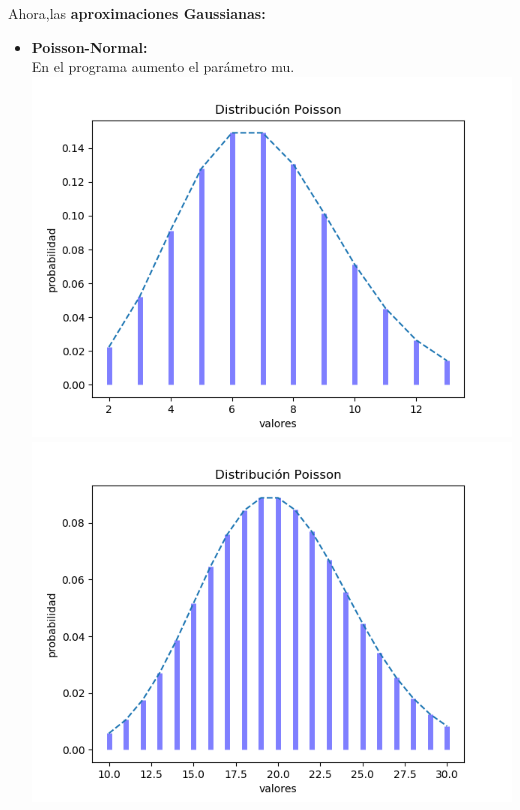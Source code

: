 \documentclass[12pt,a4paper]{article}
\begin{document}
\begin{multicols}{2}
\begin{itemize}
    \end{itemize}
    \\\\Ahora,las \textbf{aproximaciones Gaussianas:}
    \begin{itemize}
        \item \textbf{Poisson-Normal:}\\
        En el programa aumento el parámetro mu.\\
        \includegraphics[scale=0.50]{poisson_normal_1.png}
        \includegraphics[scale=0.5]{poisson_normal_2.png}

\end{itemize}
\end{multicols}
\end{document}
